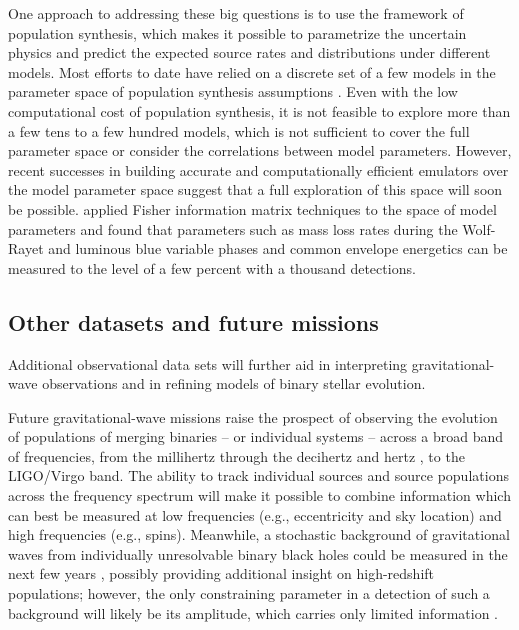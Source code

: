 \documentclass[iop,onecolumn]{revtex4}
\begin{document}
One approach to addressing these big questions is to use the framework of population synthesis, which makes it possible to parametrize the uncertain physics and predict the expected source rates and distributions under different models.  Most efforts to date have relied on a discrete set of a few models in the parameter space of population synthesis assumptions \citep[e.g.,][]{Dominik:2012,Stevenson:2015}.  Even with the low computational cost of population synthesis, it is not feasible to explore more than a few tens to a few hundred models, which is not sufficient to cover the full parameter space or consider the correlations between model parameters.  However, recent successes in building accurate and computationally efficient emulators over the model parameter space \citep{Barrett:2017} suggest that a full exploration of this space will soon be possible. \citet{Barrett:2017FIM} applied Fisher information matrix techniques to the space of model parameters and found that parameters such as mass loss rates during the Wolf-Rayet and luminous blue variable phases and common envelope energetics can be measured to the level of a few percent with a thousand detections. 

\subsection{Other datasets and future missions}
Additional observational data sets will further aid in interpreting gravitational-wave observations and in refining models of binary stellar evolution.

Future gravitational-wave missions raise the prospect of observing the evolution of populations of merging binaries -- or individual systems -- across a broad band of frequencies, from the millihertz \citep[e.g.,][]{Sesana:2016} through the decihertz \citep{Mandel:2017} and hertz \citep{ET:2012}, to the LIGO/Virgo band.  The ability to track individual sources and source populations across the frequency spectrum will make it possible to combine information which can best be measured at low frequencies (e.g., eccentricity and sky location) and high frequencies (e.g., spins).  Meanwhile, a stochastic background of gravitational waves from individually unresolvable binary black holes could be measured in the next few years \citep{GW150914:stoch}, possibly providing additional insight on high-redshift populations; however, the only constraining parameter in a detection of such a background will likely be its amplitude, which carries only limited information \citep{Callister:2016}.
\end{document}
